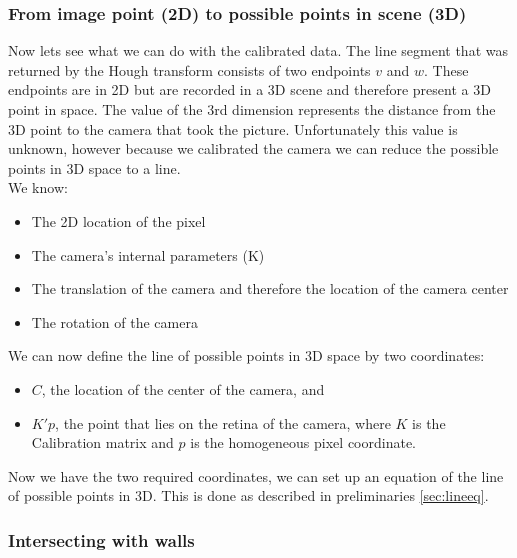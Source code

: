 	\subsubsection{From image point (2D) to possible points in scene (3D)} 
	Now lets see what we can do with the calibrated data.
	The line segment that was returned by the Hough transform consists of two
	endpoints $v$ and $w$. These endpoints are in 2D but are recorded in a 3D
	scene and therefore present a 3D point in space.  The value of the 3rd
	dimension represents the distance from the 3D point to the camera that took
	the picture. Unfortunately this value is unknown, however because we
	calibrated the camera we can reduce the possible points in 3D space to a
	line.\\

	We know:
	\begin{itemize}
		\item The 2D location of the pixel
		\item The camera's internal parameters (K) \\
		\item The translation of the camera and therefore the location of the
		camera center
		\item The rotation of the camera
	\end{itemize}

	We can now define the line of possible points in 3D space by two coordinates:\\
	\begin{itemize}
		\item $C$, the location of the center of the camera, and
		\item $K'p$, the point that lies on the retina of the camera, where $K$ is the Calibration matrix and $p$ is the homogeneous pixel coordinate.
	\end{itemize}



	Now we have the two required coordinates, we can set up an equation of the
	line of possible points in 3D.  This is done as described in preliminaries
	\ref{sec:lineeq}. 

	\subsubsection{Intersecting with walls}

